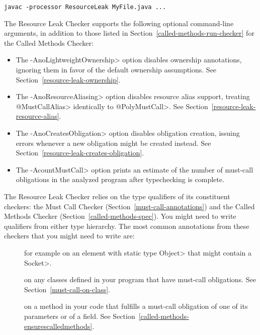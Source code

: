 
\begin{Verbatim}
javac -processor ResourceLeak MyFile.java ...
\end{Verbatim}

The Resource Leak Checker supports the following optional command-line arguments,
in addition to those listed in Section~\ref{called-methods-run-checker} for
the Called Methods Checker:
\begin{itemize}
\item The \<-AnoLightweightOwnership> option disables ownership annotations,
 ignoring them in favor of the default ownership assumptions.
 See Section~\ref{resource-leak-ownership}.
\item The \<-AnoResourceAliasing> option disables resource alias support,
 treating \<@MustCallAlias> identically to \<@PolyMustCall>.
 See Section~\ref{resource-leak-resource-alias}.
\item The \<-AnoCreatesObligation> option disables obligation creation,
 issuing errors whenever a new obligation might be created instead.
 See Section~\ref{resource-leak-creates-obligation}.
\item The \<-AcountMustCall> option prints an estimate of the number of
must-call obligations in the analyzed program after typechecking is complete.
\end{itemize}



The Resource Leak Checker relies on the type qualifiers of its constituent checkers:
the Must Call Checker (Section~\ref{must-call-annotations}) and
the Called Methods Checker (Section~\ref{called-methods-spec}). You might need
to write qualifiers from either type hierarchy. The most common annotations from
these checkers that you might need to write are:

\begin{description}

\item[]
for example on an element with static type \<Object> that might contain a \<Socket>.

\item[]
on any classes defined in your program that have must-call obligations. See Section~\ref{must-call-on-class}.

\item[] on a method in
your code that fulfills a must-call obligation of one of its parameters or of a field.
See Section~\ref{called-methods-ensurescalledmethods}.

\end{description}

